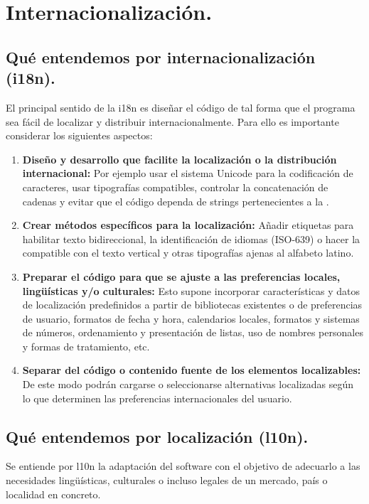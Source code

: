 
\section{Internacionalización.}\label{i18n:internacionalizacion}

\subsection{Qué entendemos por internacionalización (i18n).}\label{i18n:que-entendemos-i18n}

El principal sentido de la i18n es diseñar el código de tal forma que el programa sea fácil de localizar y distribuir internacionalmente. Para ello es importante considerar los siguientes aspectos:

\begin{enumerate}
	\item \textbf{Diseño y desarrollo que facilite la localización o la distribución internacional:}
	Por ejemplo usar el sistema Unicode para la codificación de caracteres, usar tipografías compatibles, controlar la concatenación de cadenas y evitar que el código dependa de strings pertenecientes a la .
	
	\item \textbf{Crear métodos específicos para la localización:}
	Añadir etiquetas para habilitar texto bidireccional, la identificación de idiomas (ISO-639) o hacer la  compatible con el texto vertical y otras tipografías ajenas al alfabeto latino.
	
	\item \textbf{Preparar el código para que se ajuste a las preferencias locales, lingüísticas y/o culturales:}
	Esto supone incorporar características y datos de localización predefinidos a partir de bibliotecas existentes o de preferencias de usuario, formatos de fecha y hora, calendarios locales, formatos y sistemas de números, ordenamiento y presentación de listas, uso de nombres personales y formas de tratamiento, etc.
	
	\item \textbf{Separar del código o contenido fuente de los elementos localizables:}
	De este modo podrán cargarse o seleccionarse alternativas localizadas según lo que determinen las preferencias internacionales del usuario.
\end{enumerate}

\subsection{Qué entendemos por localización (l10n).}\label{i18n:que-entendemos-l10n}
Se entiende por l10n la adaptación del software con el objetivo de adecuarlo a las necesidades lingüísticas, culturales o incluso legales de un mercado, país o localidad en concreto.

